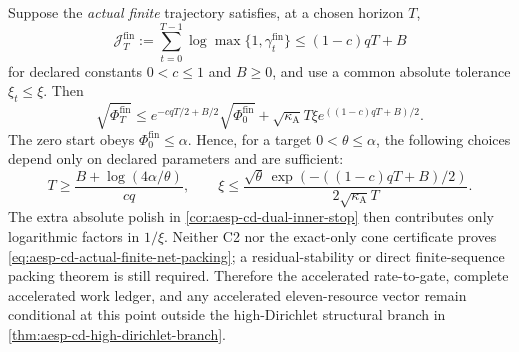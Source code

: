 \begin{corollary}
\label{cor:aesp-cd-conditional-finite-acceptance}
Suppose the \emph{actual finite} trajectory satisfies, at a chosen horizon
$T$,
\begin{equation}
 \mathcal J_T^{\mathrm{fin}}
 :=\sum_{t=0}^{T-1}\log\max\{1,\gamma_t^{\mathrm{fin}}\}
 \leq(1-c)qT+B
 \label{eq:aesp-cd-actual-finite-net-packing}
\end{equation}
for declared constants $0<c\leq1$ and $B\geq0$, and use a common absolute
tolerance $\xi_t\leq\xi$.  Then
\begin{equation}
 \sqrt{\Phi_T^{\mathrm{fin}}}
 \leq e^{-cqT/2+B/2}\sqrt{\Phi_0^{\mathrm{fin}}}
       +\sqrt{\kappa_{\mathrm A}}T\xi
          e^{((1-c)qT+B)/2}.
 \label{eq:aesp-cd-conditional-finite-bound}
\end{equation}
The zero start obeys $\Phi_0^{\mathrm{fin}}\leq\alpha$.  Hence, for a target
$0<\theta\leq\alpha$, the following choices depend only on declared
parameters and are sufficient:
\begin{equation}
 T\geq\frac{B+\log(4\alpha/\theta)}{cq},
 \qquad
 \xi\leq
 \frac{\sqrt\theta\,
       \exp(-((1-c)qT+B)/2)}
      {2\sqrt{\kappa_{\mathrm A}}T}.
 \label{eq:aesp-cd-conditional-finite-choices}
\end{equation}
The extra absolute polish in
\cref{cor:aesp-cd-dual-inner-stop} then contributes only logarithmic factors
in $1/\xi$.  Neither C2 nor the exact-only cone certificate proves
\cref{eq:aesp-cd-actual-finite-net-packing}; a residual-stability or direct
finite-sequence packing theorem is still required.  Therefore the
accelerated rate-to-gate, complete accelerated work ledger, and any
accelerated eleven-resource vector remain conditional at this point outside
the high-Dirichlet structural branch in
\cref{thm:aesp-cd-high-dirichlet-branch}.
\end{corollary}

